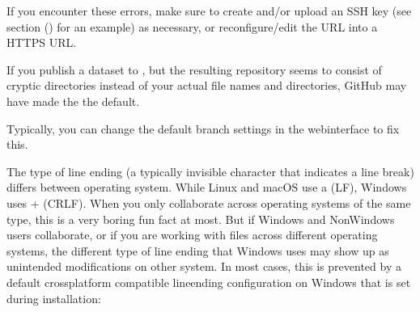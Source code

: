 \sphinxAtStartPar
If you encounter these errors, make sure to create and/or upload an SSH key (see section {\hyperref[\detokenize{basics/101-139-gin:gin}]{}} () for an example) as necessary, or reconfigure/edit the URL into a HTTPS URL.

\sphinxAtStartPar
{}

\sphinxAtStartPar
If you publish a dataset to {\hyperref[\detokenize{glossary:term-GitHub}]{}}, but the resulting repository seems to consist of cryptic directories instead of your actual file names and directories, GitHub may have made the {\hyperref[\detokenize{glossary:term-git-annex-branch}]{}} the default.

\begin{figure}[tbp]
\centering

\noindent{}
\end{figure}

\sphinxAtStartPar
Typically, you can change the default branch settings in the webinterface to fix this.

\sphinxAtStartPar
{}

\sphinxAtStartPar
The type of line ending (a typically invisible character that indicates a line break) differs between operating system.
While Linux and macOS use a  (LF), Windows uses  +  (CRLF).
When you only collaborate across operating systems of the same type, this is a very boring fun fact at most.
But if Windows\sphinxhyphen{} and Non\sphinxhyphen{}Windows users collaborate, or if you are working with files across different operating systems, the different type of line ending that Windows uses may show up as unintended modifications on other system.
In most cases, this is prevented by a default cross\sphinxhyphen{}platform compatible line\sphinxhyphen{}ending configuration on Windows that is set during installation:

\begin{figure}[tbp]
\centering

\noindent{}
\end{figure}

